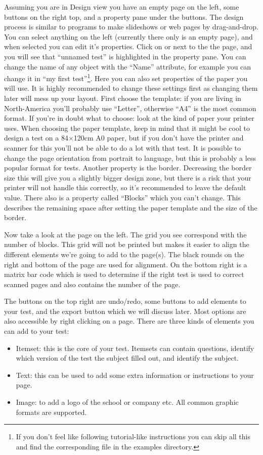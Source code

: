 \documentclass[10pt,a4paper]{article}
\begin{document}
Assuming you are in Design view you have an empty page on the left, some buttons on the right top, and a property pane under the buttons. The design process is similar to programs to make slideshows or web pages by drag-and-drop. You can select anything on the left (currently there only is an empty page), and when selected you can edit it's properties. Click on or next to the the page, and you will see that ``unnamed test'' is highlighted in the property pane. You can change the name of any object with the ``Name'' attribute, for example you can change it in ``my first test''\footnote{If you don't feel like following tutorial-like instructions you can skip all this and find the corresponding file in the examples directory.}. Here you can also set properties of the paper you will use. It is highly recommended to change these settings first as changing them later will mess up your layout. First choose the template: if you are living in North-America you'll probably use ``Letter'', otherwise ``A4'' is the most common format. If you're in doubt what to choose: look at the kind of paper your printer uses. When choosing the paper template, keep in mind that it might be cool to design a test on a 84$\times$120cm A0 paper, but if you don't have the printer and scanner for this you'll not be able to do a lot with that test. It is possible to change the page orientation from portrait to language, but this is probably a less popular format for tests. Another property is the border. Decreasing the border size this will give you a slightly bigger design zone, but there is a risk that your printer will not handle this correctly, so it's recommended to leave the default value. There also is a property called ``Blocks'' which you can't change. This describes the remaining space after setting the paper template and the size of the border.

Now take a look at the page on the left. The grid you see correspond with the number of blocks. This grid will not be printed but makes it easier to align the different elements we're going to add to the page(s). The black rounds on the right and bottom of the page are used for alignment. On the bottom right is a matrix bar code which is used to determine if the right test is used to correct scanned pages and also contains the number of the page. 

The buttons on the top right are undo/redo, some buttons to add elements to your test, and the export button which we will discuss later. Most options are also accessible by right clicking on a page. There are three kinds of elements you can add to your test:
\begin{itemize}
\item Itemset: this is the core of your test. Itemsets can contain questions, identify which version of the test the subject filled out, and identify the subject.
\item Text: this can be used to add some extra information or instructions to your page.
\item Image: to add a logo of the school or company etc. All common graphic formats are supported.
\end{itemize}
\end{document}
